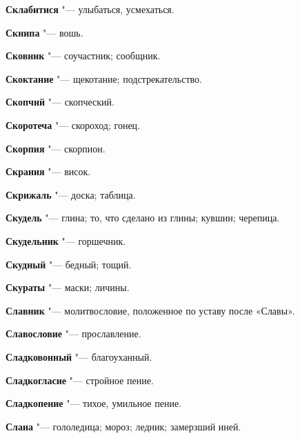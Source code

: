 \begin{mymulticols}{2}
\noindent\textbf{Склабитися} "--- улыбаться, усмехаться. 




\noindent\textbf{Скнипа} "--- вошь. 




\noindent\textbf{Сковник} "--- соучастник; сообщник. 




\noindent\textbf{Скоктание} "--- щекотание; подстрекательство. 




\noindent\textbf{Скопчий} "--- скопческий. 




\noindent\textbf{Скоротеча} "--- скороход; гонец. 




\noindent\textbf{Скорпия} "--- скорпион. 




\noindent\textbf{Скрания} "--- висок. 




\noindent\textbf{Скрижаль} "--- доска; таблица. 




\noindent\textbf{Скудель} "--- глина; то, что сделано из глины; кувшин; черепица. 




\noindent\textbf{Скудельник} "--- горшечник. 




\noindent\textbf{Скудный} "--- бедный; тощий. 




\noindent\textbf{Скураты} "--- маски; личины. 




\noindent\textbf{Славник} "--- молитвословие, положенное по уставу после «Славы». 




\noindent\textbf{Славословие} "--- прославление. 




\noindent\textbf{Сладковонный} "--- благоуханный. 




\noindent\textbf{Сладкогласие} "--- стройное пение. 




\noindent\textbf{Сладкопение} "--- тихое, умильное пение. 




\noindent\textbf{Слана} "--- гололедица; мороз; ледник; замерзший иней. 





\end{mymulticols}
